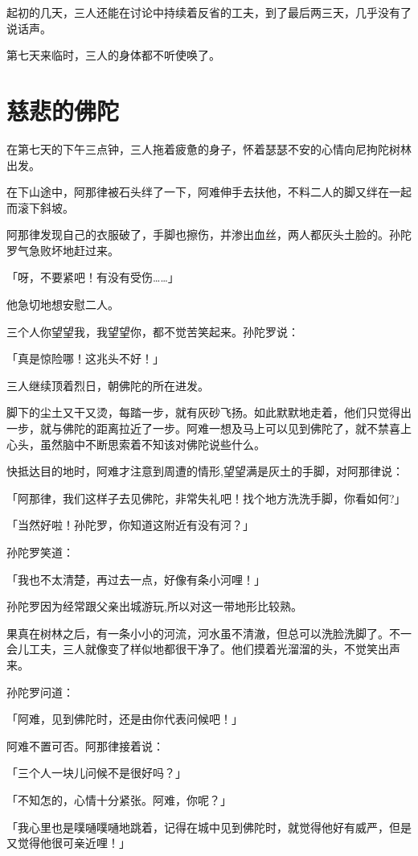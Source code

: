 \documentclass[twoside,openany]{book}
\begin{document}
起初的几天，三人还能在讨论中持续着反省的工夫，到了最后两三天，几乎没有了说话声。

第七天来临时，三人的身体都不听使唤了。

\section{慈悲的佛陀}\label{sec9.2}

在第七天的下午三点钟，三人拖着疲惫的身子，怀着瑟瑟不安的心情向尼拘陀树林出发。

在下山途中，阿那律被石头绊了一下，阿难伸手去扶他，不料二人的脚又绊在一起而滚下斜坡。

阿那律发现自己的衣服破了，手脚也擦伤，并渗出血丝，两人都灰头土脸的。孙陀罗气急败坏地赶过来。

「呀，不要紧吧！有没有受伤……」

他急切地想安慰二人。

三个人你望望我，我望望你，都不觉苦笑起来。孙陀罗说：

「真是惊险哪！这兆头不好！」

三人继续顶着烈日，朝佛陀的所在进发。

脚下的尘土又干又烫，每踏一步，就有灰砂飞扬。如此默默地走着，他们只觉得出一步，就与佛陀的距离拉近了一步。阿难一想及马上可以见到佛陀了，就不禁喜上心头，虽然脑中不断思索着不知该对佛陀说些什么。

快抵达目的地时，阿难才注意到周遭的情形,望望满是灰土的手脚，对阿那律说：

「阿那律，我们这样子去见佛陀，非常失礼吧！找个地方洗洗手脚，你看如何?」

「当然好啦！孙陀罗，你知道这附近有没有河？」

孙陀罗笑道：

「我也不太清楚，再过去一点，好像有条小河哩！」

孙陀罗因为经常跟父亲出城游玩,所以对这一带地形比较熟。

果真在树林之后，有一条小小的河流，河水虽不清澈，但总可以洗脸洗脚了。不一会儿工夫，三人就像变了样似地都很干净了。他们摸着光溜溜的头，不觉笑出声来。

孙陀罗问道：

「阿难，见到佛陀时，还是由你代表问候吧！」

阿难不置可否。阿那律接着说：

「三个人一块儿问候不是很好吗？」

「不知怎的，心情十分紧张。阿难，你呢？」

「我心里也是噗嗵噗嗵地跳着，记得在城中见到佛陀时，就觉得他好有威严，但是又觉得他很可亲近哩！」
\end{document}
